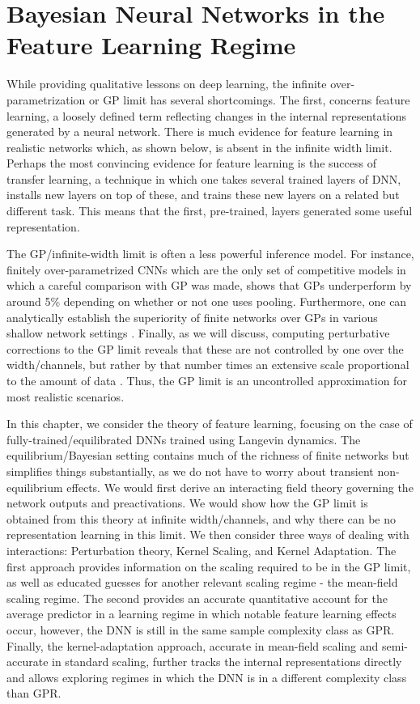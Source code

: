 \chapter{Bayesian Neural Networks in the Feature Learning Regime}
While providing qualitative lessons on deep learning, the infinite over-parametrization or GP limit has several shortcomings. The first, concerns feature learning, a loosely defined term reflecting changes in the internal representations generated by a neural network. There is much evidence for feature learning in realistic networks which, as shown below, is absent in the infinite width limit. Perhaps the most convincing evidence for feature learning is the success of transfer learning, a technique in which one takes several trained layers of DNN, installs new layers on top of these, and trains these new layers on a related but different task. This means that the first, pre-trained, layers generated some useful representation. 

The GP/infinite-width limit is often a less powerful inference model. For instance, finitely over-parametrized CNNs which are the only set of competitive models in which a careful comparison with GP was made, shows that GPs underperform \citep{novak2018bayesian,lee2020finite} by around 5\% depending on whether or not one uses pooling. Furthermore, one can analytically establish the superiority of finite networks over GPs in various shallow network settings \citep{arous2021online,Maillard2020,Luca2024}. Finally, as we will discuss, computing perturbative corrections to the GP limit reveals that these are not controlled by one over the width/channels, but rather by that number times an extensive scale proportional to the amount of data \citep{seroussi2023separation,Hanin2023}. Thus, the GP limit is an uncontrolled approximation for most realistic scenarios. 

In this chapter, we consider the theory of feature learning, focusing on the case of fully-trained/equilibrated DNNs trained using Langevin dynamics. The equilibrium/Bayesian setting contains much of the richness of finite networks but simplifies things substantially, as we do not have to worry about transient non-equilibrium effects. We would first derive an interacting field theory governing the network outputs and preactivations. We would show how the GP limit is obtained from this theory at infinite width/channels, and why there can be no representation learning in this limit. We then consider three ways of dealing with interactions: Perturbation theory, Kernel Scaling, and Kernel Adaptation. The first approach provides information on the scaling required to be in the GP limit, as well as educated guesses for another relevant scaling regime - the mean-field scaling regime. The second provides an accurate quantitative account for the average predictor in a learning regime in which notable feature learning effects occur, however, the DNN is still in the same sample complexity class as GPR. Finally, the kernel-adaptation approach, accurate in mean-field scaling and semi-accurate in standard scaling, further tracks the internal representations directly and allows exploring regimes in which the DNN is in a different complexity class than GPR. 

